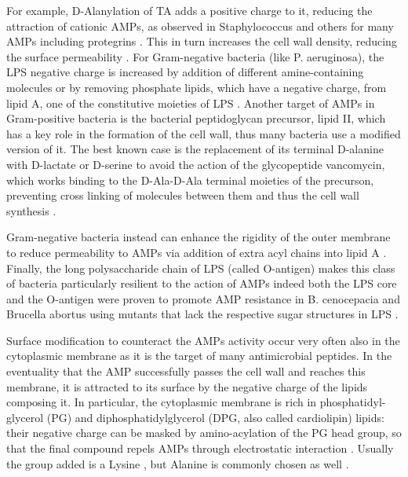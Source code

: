 For example, D-Alanylation of TA adds a positive charge to it, reducing the attraction of cationic AMPs, as observed in Staphylococcus and others for many AMPs including protegrins \cite{Peschel1999,Fabretti2006,Saar-Dover2012}.
%
This in turn increases the cell wall density, reducing the surface permeability \cite{Saar-Dover2012}.
For Gram-negative bacteria (like P. aeruginosa), the LPS negative charge is increased by addition of different amine-containing molecules \cite{Moskowitz2004,Gunn1998} or by removing phosphate lipids, which have a negative charge, from lipid A, one of the constitutive moieties of LPS \cite{Wang2004,Wang2006}. Another target of AMPs in Gram-positive bacteria is the bacterial peptidoglycan precursor, lipid II, which has a key role in the formation of the cell wall, thus many bacteria use a modified version of it.
The best known case is the replacement of its terminal D-alanine with D-lactate or D-serine \cite{Bugg1991} to avoid the action of the glycopeptide vancomycin, which works binding to the D-Ala-D-Ala terminal moieties of the precurson, preventing cross linking of molecules between them and thus the cell wall synthesis \cite{Brotz1998}.

Gram-negative bacteria instead can enhance the rigidity of the outer membrane to reduce permeability to AMPs via addition of extra acyl chains into lipid A \cite{Guo1998,Bishop2000}. Finally, the long polysaccharide chain of LPS (called O-antigen) makes this class of bacteria particularly resilient to the action of AMPs \cite{Silhavy2010} indeed both the LPS core and the O-antigen were proven to promote AMP resistance in B. cenocepacia and Brucella abortus using mutants that lack the respective sugar structures in LPS \cite{Loutet2006,Allen1998}.

Surface modification to counteract the AMPs activity occur very often also in the cytoplasmic membrane as it is the target of many antimicrobial peptides. In the eventuality that the AMP successfully passes the cell wall and reaches this membrane, it is attracted to its surface by the negative charge of the lipids composing it. In particular, the cytoplasmic membrane is rich in phosphatidyl-glycerol (PG) and diphosphatidylglycerol (DPG, also called cardiolipin) lipids: their negative charge can be masked by amino-acylation of the PG head group, so that the final compound repels AMPs through electrostatic interaction \cite{Peschel2001}. Usually the group added is a Lysine \cite{Thedieck2006}, but Alanine is commonly chosen as well \cite{Klein2009}.

